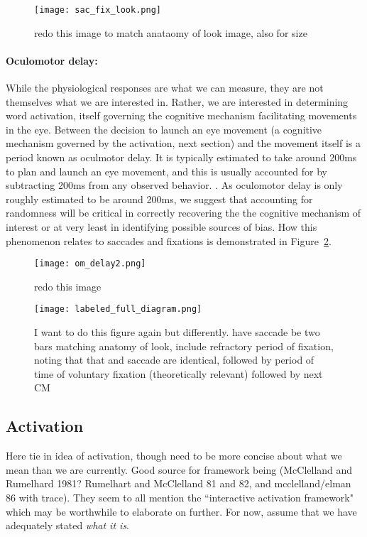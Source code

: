 \begin{figure}[H]
\centering
\texttt{[image: sac\_fix\_look.png]}
\caption{redo this image to match anataomy of look image, also for size}
\label{fig:sac_fix_look}
\end{figure}

\paragraph{Oculomotor delay:} While the physiological responses are what we can measure, they are not themselves what we are interested in. Rather, we are interested in determining word activation, itself governing the cognitive mechanism facilitating movements in the eye. Between the decision to launch an eye movement (a cognitive mechanism governed by the activation, next section) and the movement itself is a period known as oculmotor delay. It is typically estimated to take around 200ms to plan and launch an eye movement, and this is usually accounted for by subtracting 200ms from any observed behavior. \cite{viviani1990time}. As oculomotor delay is only roughly estimated to be around 200ms, we suggest that accounting for randomness will be critical in correctly recovering the the cognitive mechanism of interest or at very least in identifying possible sources of bias. How this phenomenon relates to saccades and fixations is demonstrated in Figure~\ref{fig:sac_fix_look_om}.


\begin{figure}[H]
\centering
\texttt{[image: om\_delay2.png]}
\caption{redo this image}
\label{fig:sac_fix_look_om}
\end{figure}


\begin{figure}
\centering
\texttt{[image: labeled\_full\_diagram.png]}
\caption{I want to do this figure again but differently. have saccade be  two bars matching anatomy of look, include refractory period of fixation, noting that that and saccade are identical, followed by period of time of voluntary fixation (theoretically relevant) followed by next CM}
\label{fig:full_diagram_looks}
\end{figure}

\subsection{Activation}

Here tie in idea of activation, though need to be more concise about what we mean than we are currently. Good source for framework being (McClelland and Rumelhard 1981? Rumelhart and McClelland 81 and 82, and mcclelland/elman 86 with trace). They seem to all mention the ``interactive activation framework" which may be worthwhile to elaborate on further. For now, assume that we have adequately stated \textit{what it is}.

